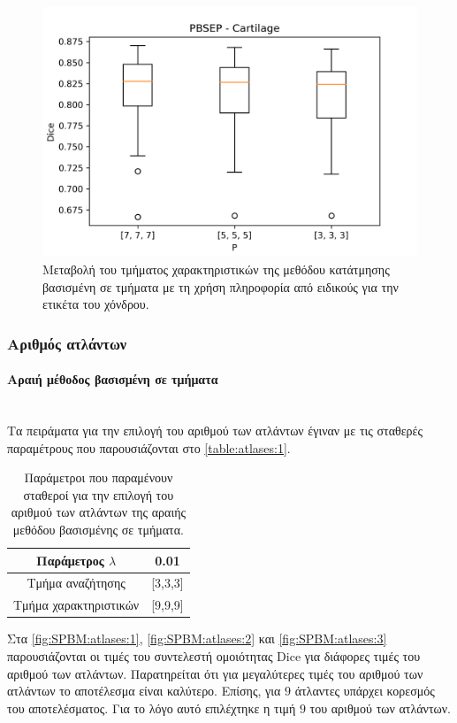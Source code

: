 \documentclass[a4paper,12pt]{article}
\newcommand{\paragraphLine}[1]{\paragraph{#1}\mbox{}\\}
\begin{document}
\begin{figure}[H]
    \centering
    \includegraphics[width=0.85\linewidth]{PBSEP_P_Cartilage_plot.png}
    \caption{Μεταβολή του τμήματος χαρακτηριστικών της μεθόδου κατάτμησης
             βασισμένη σε τμήματα με τη χρήση πληροφορία από ειδικούς για την
             ετικέτα του χόνδρου.}
    \label{fig:PBSEP:P:3}
\end{figure}

\subsubsection{Αριθμός ατλάντων}

\paragraphLine{Αραιή μέθοδος βασισμένη σε τμήματα}

Τα πειράματα για την επιλογή του αριθμού των ατλάντων έγιναν με τις σταθερές
παραμέτρους που παρουσιάζονται στο \autoref{table:atlases:1}.

\begin{table}[h!]
    \centering
    \begin{tabular}{|c|c|} 
        \hline
        Παράμετρος $\lambda$ & 0.01 \\ 
        \hline
        Τμήμα αναζήτησης & [3,3,3] \\ 
        \hline
        Τμήμα χαρακτηριστικών & [9,9,9] \\ 
        \hline
    \end{tabular}
    \caption{Παράμετροι που παραμένουν σταθεροί για την επιλογή του αριθμού των
             ατλάντων της αραιής μεθόδου βασισμένης σε τμήματα.}
    \label{table:atlases:1}
\end{table}

Στα \autoref{fig:SPBM:atlases:1}, \autoref{fig:SPBM:atlases:2} και
\autoref{fig:SPBM:atlases:3} παρουσιάζονται οι τιμές του συντελεστή ομοιότητας
Dice για διάφορες τιμές του αριθμού των ατλάντων. Παρατηρείται ότι για
μεγαλύτερες τιμές του αριθμού των ατλάντων το αποτέλεσμα είναι καλύτερο. Επίσης,
για $9$ άτλαντες υπάρχει κορεσμός του αποτελέσματος. Για το λόγο αυτό επιλέχτηκε
η τιμή $9$ του αριθμού των ατλάντων.
\end{document}
